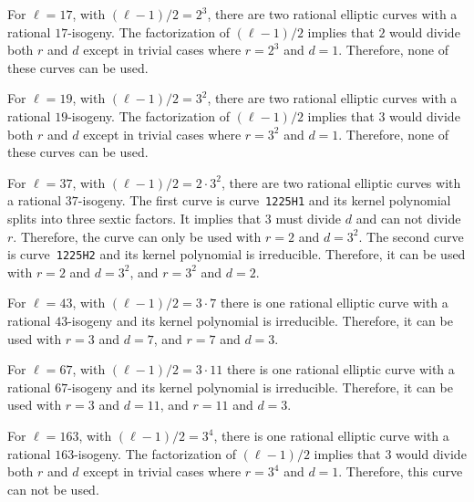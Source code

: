 \documentclass[12pt]{article}
\theoremstyle{plain}
\theoremstyle{definition}
\def\Q{\ensuremath{\mathbb{Q}}}
\begin{document}
For $\ell = 17$, with $(\ell-1)/2 = 2^3$,
there are two rational elliptic curves
with a rational $17$-isogeny.
The factorization of $(\ell-1)/2$ implies
that $2$ would divide both $r$ and $d$
except in trivial cases where $r = 2^3$ and $d = 1$.
Therefore, none of these curves can be used.

For $\ell = 19$,  with $(\ell-1)/2 = 3^2$,
there are two rational elliptic curves
with a rational $19$-isogeny.
The factorization of $(\ell-1)/2$ implies
that $3$ would divide both $r$ and $d$
except in trivial cases where $r = 3^2$ and $d = 1$.
Therefore, none of these curves can be used.

For $\ell = 37$, with $(\ell-1)/2 = 2\cdot3^2$,
there are two rational elliptic curves
with a rational $37$-isogeny.
The first curve is curve~\texttt{1225H1}
and its kernel polynomial splits into three sextic factors.
It implies that $3$ must divide $d$ and can not divide $r$.
Therefore, the curve can only be used with $r = 2$ and $d = 3^2$.
The second curve is curve~\texttt{1225H2}
and its kernel polynomial is irreducible.
Therefore, it can be used with $r = 2$ and $d = 3^2$,
and $r = 3^2$ and $d = 2$.

For $\ell = 43$, with $(\ell-1)/2 = 3\cdot7$
there is one rational elliptic curve
with a rational $43$-isogeny 
and its kernel polynomial is irreducible.
Therefore, it can be used with $r = 3$ and $d = 7$,
and $r = 7$ and $d = 3$.

For $\ell = 67$, with $(\ell-1)/2 = 3\cdot11$
there is one rational elliptic curve
with a rational $67$-isogeny 
and its kernel polynomial is irreducible.
Therefore, it can be used with $r = 3$ and $d = 11$,
and $r = 11$ and $d = 3$.

For $\ell = 163$, with $(\ell-1)/2 = 3^4$,
there is one rational elliptic curve
with a rational $163$-isogeny.
The factorization of $(\ell-1)/2$ implies
that $3$ would divide both $r$ and $d$
except in trivial cases where $r = 3^4$ and $d = 1$.
Therefore, this curve can not be used.
\end{document}
